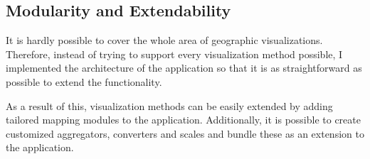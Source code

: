 \subsection{Modularity and Extendability}

It is hardly possible to cover the whole area of geographic visualizations. Therefore, instead of trying to support every visualization method possible, I implemented the architecture of the application so that it is as straightforward as possible to extend the functionality.

As a result of this, visualization methods can be easily extended by adding tailored mapping modules to the application. Additionally, it is possible to create customized aggregators, converters and scales and bundle these as an extension to the application.

~

